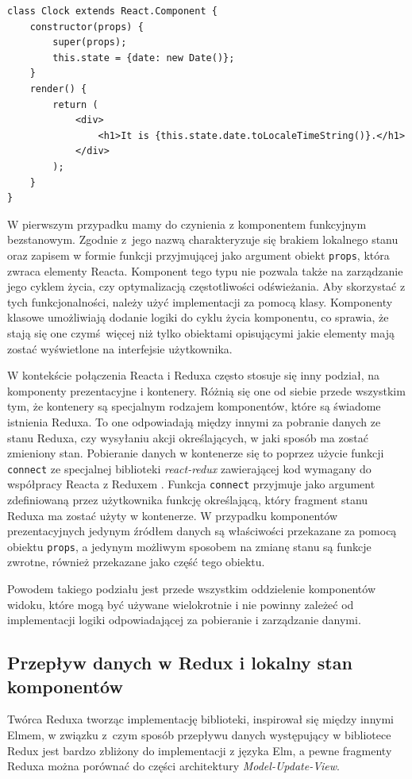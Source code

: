 \begin{lstlisting}[style=JavaScript, caption=Komponent stanowy jako klasa ECMAScript 6, label=listing:statefulcomp]
class Clock extends React.Component {
	constructor(props) {
		super(props);
		this.state = {date: new Date()};
	}
	render() {
		return (
			<div>
				<h1>It is {this.state.date.toLocaleTimeString()}.</h1>
			</div>
		);
	}
}
\end{lstlisting}
W pierwszym przypadku mamy do czynienia z komponentem funkcyjnym bezstanowym. Zgodnie z~jego nazwą charakteryzuje się brakiem lokalnego stanu oraz zapisem w formie funkcji przyjmującej jako argument obiekt \lstinline{props}, która zwraca elementy Reacta. Komponent tego typu nie pozwala także na zarządzanie jego cyklem życia, czy optymalizacją częstotliwości odświeżania. Aby skorzystać z tych funkcjonalności, należy użyć implementacji za pomocą klasy. Komponenty klasowe umożliwiają dodanie logiki do cyklu życia komponentu, co sprawia, że stają się one czymś więcej niż tylko obiektami opisującymi jakie elementy mają zostać wyświetlone na interfejsie użytkownika.

W kontekście połączenia Reacta i Reduxa często stosuje się inny podział, na komponenty prezentacyjne i kontenery. Różnią się one od siebie przede wszystkim tym, że kontenery są specjalnym rodzajem komponentów, które są świadome istnienia Reduxa. To one odpowiadają między innymi za pobranie danych ze stanu Reduxa, czy wysyłaniu akcji określających, w jaki sposób ma zostać zmieniony stan. Pobieranie danych w kontenerze się to poprzez użycie funkcji \lstinline{connect} ze specjalnej biblioteki \textit{react-redux} zawierającej kod wymagany do współpracy Reacta z Reduxem \cite{reduxDocs}. Funkcja \lstinline{connect} przyjmuje jako argument zdefiniowaną przez użytkownika funkcję określającą, który fragment stanu Reduxa ma zostać użyty w kontenerze. W przypadku komponentów prezentacyjnych jedynym źródłem danych są właściwości przekazane za pomocą obiektu \lstinline{props}, a jedynym możliwym sposobem na zmianę stanu są funkcje zwrotne, również przekazane jako część tego obiektu.

Powodem takiego podziału jest przede wszystkim oddzielenie komponentów widoku, które mogą być używane wielokrotnie i nie powinny zależeć od implementacji logiki odpowiadającej za pobieranie i zarządzanie danymi.

\subsection{Przepływ danych w Redux i lokalny stan komponentów}
Twórca Reduxa tworząc implementację biblioteki, inspirował się między innymi Elmem, w związku z~czym sposób przepływu danych występujący w bibliotece Redux jest bardzo zbliżony do implementacji z języka Elm, a pewne fragmenty Reduxa można porównać do części architektury \textit{Model-Update-View}.

